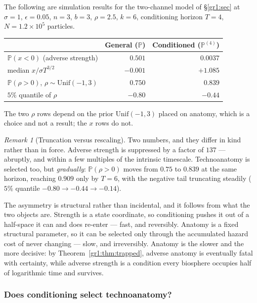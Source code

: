 \documentclass[11pt]{article}
\numberwithin{equation}{section}
\theoremstyle{plain}
\theoremstyle{definition}
\theoremstyle{remark}
\newtheorem{remark}[theorem]{Remark}
\newcommand{\PP}{\mathbb{P}}
\begin{document}
The following are simulation results for the two-channel model of
\S\ref{gr1:sec} at $\sigma=1$, $\epsilon=0.05$, $n=3$, $b=3$, $\rho=2.5$,
$k=6$, conditioning horizon $T=4$, $N=1.2\times10^{5}$ particles.

\begin{center}\small
\begin{tabular}{@{}lrr@{}}
\toprule
& General ($\PP$) & Conditioned ($\PP^{(4)}$)\\
\midrule
$\PP(x<0)$ (adverse strength) & $0.501$ & $0.0037$\\
median $x/\sigma T^{3/2}$ & $-0.001$ & $+1.085$\\
$\PP(\rho>0)$, $\rho\sim\mathrm{Unif}(-1,3)$ & $0.750$ & $0.839$\\
$5\%$ quantile of $\rho$ & $-0.80$ & $-0.44$\\
\bottomrule
\end{tabular}
\end{center}

\noindent The two $\rho$ rows depend on the prior $\mathrm{Unif}(-1,3)$
placed on anatomy, which is a choice and not a result; the $x$ rows do
not.

\begin{remark}[Truncation versus rescaling]\label{gr:rem:truncresc}
Two numbers, and they differ in kind rather than in force.
Adverse strength is suppressed by a factor of $137$ --- abruptly, and
within a few multiples of the intrinsic timescale. Technoanatomy is
selected too, but \emph{gradually}: $\PP(\rho>0)$ moves from $0.75$ to
$0.839$ at the same horizon, reaching $0.909$ only by $T=6$, with the
negative tail truncating steadily ($5\%$ quantile $-0.80\to-0.44\to
-0.14$).

The asymmetry is structural rather than incidental, and it follows from
what the two objects are. Strength is a state coordinate, so
conditioning pushes it out of a half-space it can and does re-enter ---
fast, and reversibly. Anatomy is a fixed structural parameter, so it can
be selected only through the accumulated hazard cost of never changing
--- slow, and irreversibly. Anatomy is the slower and the more decisive:
by Theorem~\ref{gr1:thm:trapped}, adverse anatomy is eventually fatal
with certainty, while adverse strength is a condition every biosphere
occupies half of logarithmic time and survives.


\end{remark}

\subsubsection{Does conditioning select technoanatomy?}
\label{gr:subsub:anatsel}
\end{document}

